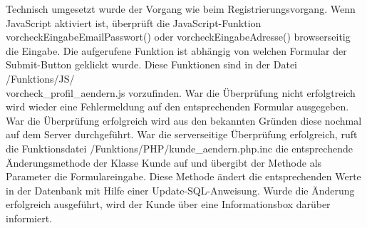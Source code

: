 Technisch umgesetzt wurde der Vorgang wie beim Registrierungsvorgang. Wenn JavaScript aktiviert ist, überprüft die JavaScript-Funktion \glqq vorcheckEingabeEmailPasswort()\grqq{} oder \glqq vorcheckEingabeAdresse()\grqq{} browserseitig die Eingabe. Die aufgerufene Funktion ist abhängig von welchen Formular der Submit-Button geklickt wurde. Diese Funktionen sind in der Datei \glqq /Funktions/JS/ \\ vorcheck\_profil\_aendern.js\grqq{} vorzufinden. War die Überprüfung nicht erfolgtreich wird wieder eine Fehlermeldung auf den entsprechenden Formular ausgegeben. War die Überprüfung erfolgreich wird aus den bekannten Gründen diese nochmal auf dem Server durchgeführt. War die serverseitige Überprüfung erfolgreich, ruft die Funktionsdatei \glqq /Funktions/PHP/kunde\_aendern.php.inc\grqq{} die entsprechende Änderungsmethode der Klasse \glqq Kunde\grqq{} auf und übergibt der Methode als Parameter die Formulareingabe. Diese Methode ändert die entsprechenden Werte in der Datenbank mit Hilfe einer Update-SQL-Anweisung. Wurde die Änderung erfolgreich ausgeführt, wird der Kunde über eine Informationsbox darüber informiert.

